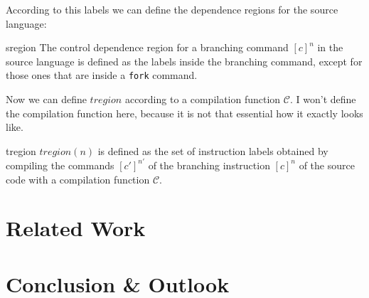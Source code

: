\documentclass[a4paper,10pt]{llncs}
\begin{document}
According to this labels we can define the dependence regions for the source language:

\begin{definition}{sregion}
The control dependence region for a branching command $[c]^n$ in the source language is
defined as the labels inside the branching command, except for those ones that are inside a
\texttt{fork} command.
\end{definition}

Now we can define $tregion$ according to a compilation function $\mathcal{C}$. I won't define
the compilation function here, because it is not that essential how it exactly looks like.

\begin{definition}{tregion}
$tregion(n)$ is defined as the set of instruction labels obtained by compiling the commands
$[c']^{n'}$ of the branching instruction $[c]^n$ of the source code with a compilation function $\mathcal{C}$.
\end{definition}

\section{Related Work}
\label{sec:relatedwork}
\section{Conclusion \& Outlook}
\label{sec:conclusion}


\end{document}
